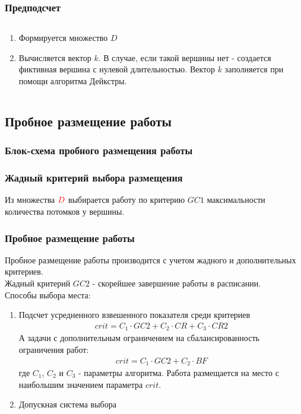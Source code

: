 \begin{frame}
    \frametitle{Предподсчет}
    \begin{columns}
        \begin{column}{0.6\textwidth}
            \begin{enumerate}
                \item Формируется множество $D$
                \item Вычисляется вектор $k$. В случае, если такой вершины нет - создается фиктивная вершина с нулевой длительностью. Вектор $k$ заполняется при помощи алгоритма Дейкстры.
            \end{enumerate}
        \end{column}
        \begin{column}{0.4\textwidth}
        \end{column}
    \end{columns}
\end{frame}


\subsection{Пробное размещение работы}
\begin{frame}
    \frametitle{Блок-схема пробного размещения работы}
    {\tiny
    }
\end{frame}

\begin{frame}
    \frametitle{Жадный критерий выбора размещения}
    Из множества $\color{red}D$ выбирается работу по критерию $GC1$ максимальности количества потомков у вершины.
\end{frame}

\begin{frame}
    \frametitle{Пробное размещение работы}
    Пробное размещение работы производится с учетом  жадного и дополнительных критериев. \\
    Жадный критерий $GC2$ - скорейшее завершение работы в расписании. \\
    Способы выбора места:
    \begin{enumerate}
        \item Подсчет усредненного взвешенного показателя среди критериев \\
        \begin{gather*}
            crit = C_1 \cdot GC2 + C_2 \cdot CR + C_3 \cdot CR2
        \end{gather*}
        А задачи с дополнительным ограничением на сбалансированность ограничения работ:
        \begin{gather*}
            crit = C_1 \cdot GC2 + C_2 \cdot BF
        \end{gather*}
        где $C_1$, $C_2$ и $C_3$ - параметры алгоритма. Работа размещается на место с наибольшим значением параметра $crit$.
        \item Допускная система выбора
    \end{enumerate}
\end{frame}

